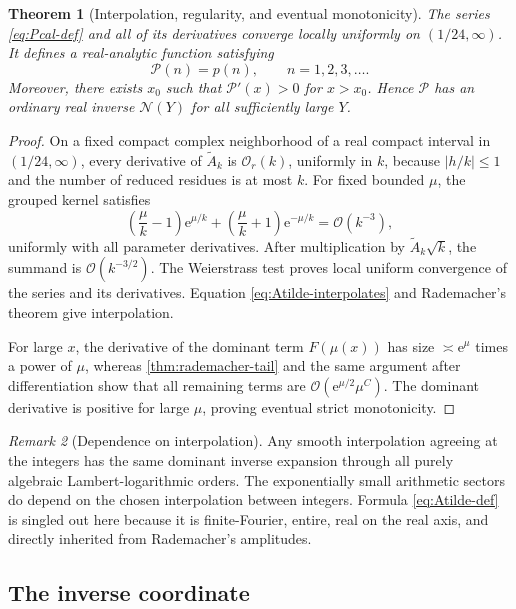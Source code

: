 \documentclass[11pt]{article}
\numberwithin{equation}{section}
\theoremstyle{mainthm}
\newtheorem{theorem}{Theorem}[section]
\theoremstyle{defstyle}
\theoremstyle{remark}
\newtheorem{remark}[theorem]{Remark}
\newcommand{\e}{\mathrm e}
\newcommand{\cO}{\mathcal O}
\newcommand{\Pcal}{\mathcal P}
\newcommand{\Ncal}{\mathcal N}
\begin{document}
\begin{theorem}[Interpolation, regularity, and eventual monotonicity]\label{thm:Pcal-properties}
The series \eqref{eq:Pcal-def} and all of its derivatives converge locally uniformly on \((1/24,\infty)\).  It defines a real-analytic function satisfying
\[
 \Pcal(n)=p(n),\qquad n=1,2,3,\ldots.
\]
Moreover, there exists \(x_0\) such that \(\Pcal'(x)>0\) for \(x>x_0\).  Hence \(\Pcal\) has an ordinary real inverse \(\Ncal(Y)\) for all sufficiently large \(Y\).
\end{theorem}

\begin{proof}
On a fixed compact complex neighborhood of a real compact interval in \((1/24,\infty)\), every derivative of \(\widetilde A_k\) is \(\cO_r(k)\), uniformly in \(k\), because \(|h/k|\le1\) and the number of reduced residues is at most \(k\).  For fixed bounded \(\mu\), the grouped kernel satisfies
\[
 \left(\frac\mu k-1\right)\e^{\mu/k}
 +\left(\frac\mu k+1\right)\e^{-\mu/k}
 =\cO(k^{-3}),
\]
uniformly with all parameter derivatives.  After multiplication by \(\widetilde A_k\sqrt{k}\), the summand is \(\cO(k^{-3/2})\).  The Weierstrass test proves local uniform convergence of the series and its derivatives.  Equation \eqref{eq:Atilde-interpolates} and Rademacher's theorem give interpolation.

For large \(x\), the derivative of the dominant term \(F(\mu(x))\) has size \(\asymp\e^\mu\) times a power of \(\mu\), whereas \cref{thm:rademacher-tail} and the same argument after differentiation show that all remaining terms are \(\cO(\e^{\mu/2}\mu^C)\).  The dominant derivative is positive for large \(\mu\), proving eventual strict monotonicity.
\end{proof}

\begin{remark}[Dependence on interpolation]
Any smooth interpolation agreeing at the integers has the same dominant inverse expansion through all purely algebraic Lambert-logarithmic orders.  The exponentially small arithmetic sectors do depend on the chosen interpolation between integers.  Formula \eqref{eq:Atilde-def} is singled out here because it is finite-Fourier, entire, real on the real axis, and directly inherited from Rademacher's amplitudes.
\end{remark}

\subsection{The inverse coordinate}
\end{document}
